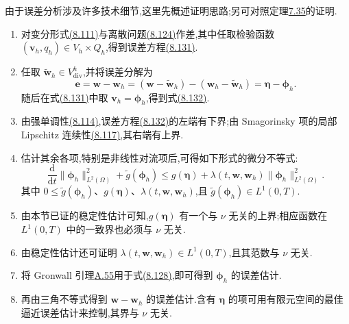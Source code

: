 \begin{note}[证明提纲]
\label{note:smagorinsky-fem-error-analysis-outline}
由于误差分析涉及许多技术细节,这里先概述证明思路;另可对照定理\hyperref[thm:time-dependent-leray-hopf-existence]{7.35}的证明.
\begin{enumerate}
  \item 对变分形式\hyperref[eq:smagorinsky-generalized-weak-form]{(8.111)}与离散问题\hyperref[eq:smagorinsky-continuous-time-fem-problem]{(8.124)}作差,其中任取检验函数 $(\bm{v}_h,q_h)\in V_h\times Q_h$,得到误差方程\hyperref[eq:smagorinsky-error-equation]{(8.131)}.
  \item 任取 $\widetilde{\bm{w}}_h\in V_{\mathrm{div}}^h$,并将误差分解为
  \[
    \bm{e}=\bm{w}-\bm{w}_h
       =(\bm{w}-\widetilde{\bm{w}}_h)
        -(\bm{w}_h-\widetilde{\bm{w}}_h)
       =\symbf{\eta}-\symbf{\phi}_h.
  \]
  随后在式\hyperref[eq:smagorinsky-error-equation]{(8.131)}中取 $\bm{v}_h=\symbf{\phi}_h$,得到式\hyperref[eq:smagorinsky-error-equation-tested]{(8.132)}.
  \item 由强单调性\hyperref[eq:smagorinsky-strain-strong-monotonicity]{(8.114)},误差方程\hyperref[eq:smagorinsky-error-equation-tested]{(8.132)}的左端有下界;由 Smagorinsky 项的局部 Lipschitz 连续性\hyperref[eq:smagorinsky-strain-local-lipschitz]{(8.117)},其右端有上界.
  \item 估计其余各项,特别是非线性对流项后,可得如下形式的微分不等式:
  \begin{equation}\label{eq:smagorinsky-error-differential-inequality}
    \frac{\mathrm{d}}{\mathrm{d}t}
       \|\symbf{\phi}_h\|_{L^2(\Omega)}^2
      +\widetilde g(\symbf{\phi}_h)
    \le g(\symbf{\eta})
      +\lambda(t,\bm{w},\bm{w}_h)
       \|\symbf{\phi}_h\|_{L^2(\Omega)}^2.
  \end{equation}
  其中 $0\le\widetilde g(\symbf{\phi}_h)$、$g(\symbf{\eta})$、$\lambda(t,\bm{w},\bm{w}_h)$,且 $\widetilde g(\symbf{\phi}_h)\in L^1(0,T)$.
  \item 由本节已证的稳定性估计可知,$g(\symbf{\eta})$ 有一个与 $\nu$ 无关的上界;相应函数在 $L^1(0,T)$ 中的一致界也必须与 $\nu$ 无关.
  \item 由稳定性估计还可证明 $\lambda(t,\bm{w},\bm{w}_h)\in L^1(0,T)$,且其范数与 $\nu$ 无关.
  \item 将 Gronwall 引理\hyperref[lem:appendix-a-55]{A.55}用于式\hyperref[eq:smagorinsky-error-differential-inequality]{(8.128)},即可得到 $\symbf{\phi}_h$ 的误差估计.
  \item 再由三角不等式得到 $\bm{w}-\bm{w}_h$ 的误差估计.含有 $\symbf{\eta}$ 的项可用有限元空间的最佳逼近误差估计来控制,其界与 $\nu$ 无关.
\end{enumerate}
\end{note}

